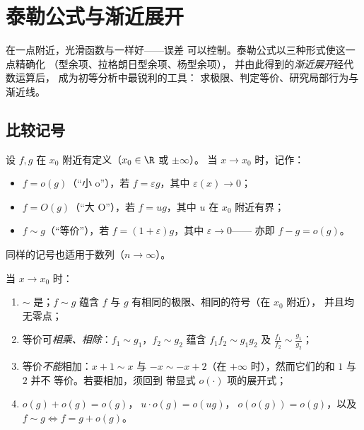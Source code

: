 \chapter{泰勒公式与渐近展开}\label{ch:b1:taylor}

在一点附近，光滑函数与一样好——误差
可以控制。泰勒公式以三种形式使这一点精确化
（型余项、拉格朗日型余项、杨型余项），
并由此得到的\emph{渐近展开}经代数运算后，
成为初等分析中最锐利的工具：
求极限、判定等价、研究局部行为与渐近线。

\section{比较记号}

\begin{definition}[兰道记号]\label{def:b1:taylor:landau}
设 $f, g$ 在 $x_0$ 附近有定义（$x_0 \in \R$ 或 $\pm\infty$）。
当 $x \to x_0$ 时，记作：
\begin{itemize}
  \item $f = o(g)$（“小 o”），若 $f = \varepsilon g$，其中
        $\varepsilon(x) \to 0$；
  \item $f = O(g)$（“大 O”），若 $f = u g$，其中
        $u$ 在 $x_0$ 附近有界；
  \item $f \sim g$（“等价”），若
        $f = (1 + \varepsilon) g$，其中 $\varepsilon \to 0$——
        亦即 $f - g = o(g)$。
\end{itemize}
同样的记号也适用于数列（$n \to \infty$）。
\end{definition}

\begin{proposition}[运算法则]\label{prop:b1:taylor:landaurules}
当 $x \to x_0$ 时：
\begin{enumerate}
  \item $\sim$ 是；$f \sim g$ 蕴含
        $f$ 与 $g$ 有相同的极限、相同的符号（在 $x_0$ 附近），
        并且均无零点；
  \item 等价可\emph{相乘、相除}：$f_1 \sim g_1$，$f_2
        \sim g_2$ 蕴含 $f_1 f_2 \sim g_1 g_2$ 及 $\frac{f_1}{f_2}
        \sim \frac{g_1}{g_2}$；
  \item 等价\emph{不能}相加：$x + 1 \sim x$ 与 $-x \sim
        -x + 2$（在 $+\infty$ 时），然而它们的和 $1$ 与 $2$ 并不
        等价。若要相加，须回到
        带显式 $o(\cdot)$ 项的展开式；
  \item $o(g) + o(g) = o(g)$，$\;u \cdot o(g) = o(ug)$，$\;o(o(g)) =
        o(g)$，以及 $f \sim g \iff f = g + o(g)$。
\end{enumerate}
\end{proposition}

